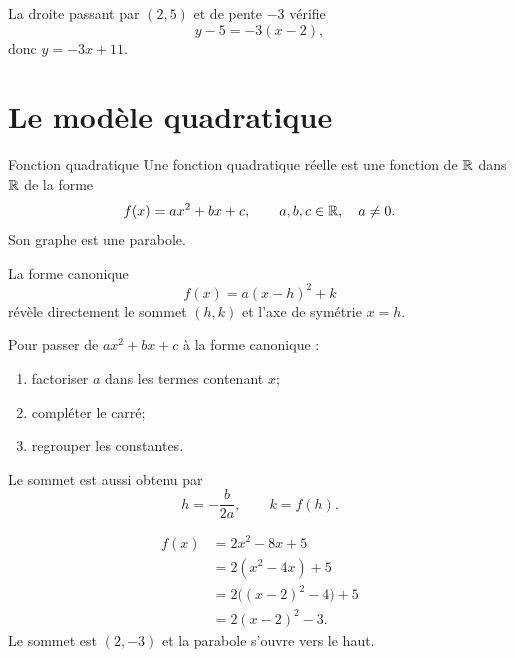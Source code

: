\begin{examplebox}
La droite passant par $(2,5)$ et de pente $-3$ vérifie
\[
y-5=-3(x-2),
\]
donc $y=-3x+11$.
\end{examplebox}

\section{Le modèle quadratique}
\label{manual:section:04.02}

\begin{definition}{Fonction quadratique}{}
Une fonction quadratique réelle est une fonction de $\mathbb{R}$ dans $\mathbb{R}$ de la forme
\[
f(x)=ax^2+bx+c,
\qquad a,b,c\in\mathbb{R},\quad a\neq0.
\]
Son graphe est une parabole.
\end{definition}

La forme canonique
\[
f(x)=a(x-h)^2+k
\]
révèle directement le sommet $(h,k)$ et l'axe de symétrie $x=h$.

\begin{center}
\end{center}

\begin{methodbox}
Pour passer de $ax^2+bx+c$ à la forme canonique :
\begin{enumerate}
\item factoriser $a$ dans les termes contenant $x$;
\item compléter le carré;
\item regrouper les constantes.
\end{enumerate}
Le sommet est aussi obtenu par
\[
h=-\frac{b}{2a},\qquad k=f(h).
\]
\end{methodbox}

\begin{examplebox}
\begin{align*}
f(x)&=2x^2-8x+5\\
&=2(x^2-4x)+5\\
&=2\bigl((x-2)^2-4\bigr)+5\\
&=2(x-2)^2-3.
\end{align*}
Le sommet est $(2,-3)$ et la parabole s'ouvre vers le haut.
\end{examplebox}

